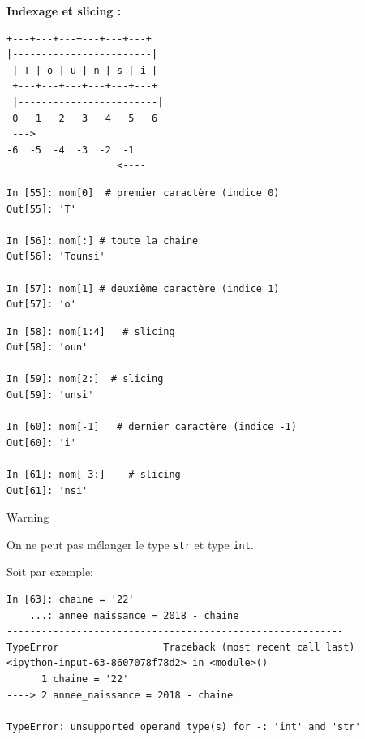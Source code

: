 \documentclass{beamer}
\begin{document}
\begin{frame}

\noindent\textbf{Indexage et slicing :}

\begin{Verbatim}[numbers=none,fontsize=\fontsize{9pt}{9pt},baselinestretch=0.95]
 +---+---+---+---+---+---+
|------------------------|
 | T | o | u | n | s | i |
 +---+---+---+---+---+---+
 |------------------------|
 0   1   2   3   4   5   6
 --->
-6  -5  -4  -3  -2  -1
                   <----
\end{Verbatim}
\begin{verbatim}
In [55]: nom[0]  # premier caractère (indice 0)
Out[55]: 'T'

In [56]: nom[:] # toute la chaine
Out[56]: 'Tounsi'

In [57]: nom[1] # deuxième caractère (indice 1)
Out[57]: 'o'
\end{verbatim}
\end{frame}

\begin{frame}

\begin{verbatim}
In [58]: nom[1:4]   # slicing
Out[58]: 'oun'

In [59]: nom[2:]  # slicing
Out[59]: 'unsi'

In [60]: nom[-1]   # dernier caractère (indice -1)
Out[60]: 'i'

In [61]: nom[-3:]    # slicing
Out[61]: 'nsi'

\end{verbatim}
\end{frame}

\begin{frame}

\begin{block}{Warning}

On ne peut pas mélanger le type \texttt{str} et type \texttt{int}.

Soit par exemple:
\begin{verbatim}
In [63]: chaine = '22'
    ...: annee_naissance = 2018 - chaine
----------------------------------------------------------
TypeError                  Traceback (most recent call last)
<ipython-input-63-8607078f78d2> in <module>()
      1 chaine = '22'
----> 2 annee_naissance = 2018 - chaine

TypeError: unsupported operand type(s) for -: 'int' and 'str'
\end{verbatim}
\end{block}
\end{frame}
\end{document}
